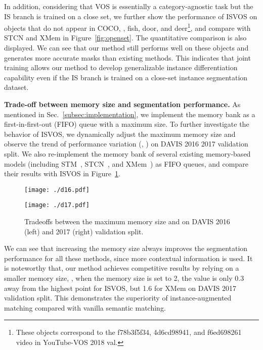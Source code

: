 \documentclass[10pt,twocolumn,letterpaper]{article}
\newcommand{\system}{ISVOS\xspace}
\begin{document}
In addition, considering that VOS is essentially a category-agnostic task but the IS branch is trained on a close set, we further show the performance of \system on objects that do not appear in COCO, \eg, fish, door, and deer\footnote{These objects correspond to the f78b3f5f34, 4d6cd98941, and f6ed698261 video in YouTube-VOS 2018 val.}, and compare with STCN and XMem in Figure~\ref{fig:openset}. The quantitative comparison is also displayed. We can see that our method still performs well on these objects and generates more accurate masks than existing methods. This indicates that joint training allows our method to develop generalizable instance differentiation capability even if the IS branch is trained on a close-set instance segmentation dataset.

\vspace{0.05in}
\noindent \textbf{Trade-off between memory size and segmentation performance.} As mentioned in Sec.~\ref{subsec:implementation}, we implement the memory bank as a first-in-first-out (FIFO) queue with a maximum size. To further investigate the behavior of \system, we dynamically adjust the maximum memory size and observe the trend of performance variation (\ie, ) on DAVIS 2016  2017 validation split. We also re-implement the memory bank of several existing memory-based models (including STM~\cite{oh2019video}, STCN~\cite{cheng2021stcn}, and XMem~\cite{cheng2022xmem}) as FIFO queues, and compare their results with \system in Figure~\ref{fig:tradeoffs}.

\begin{figure}[!ht]
\begin{minipage}[t]{0.49\linewidth}
\centering
\texttt{[image: ./d16.pdf]}
\end{minipage}
\begin{minipage}[t]{0.49\linewidth}
\centering
\texttt{[image: ./d17.pdf]}
\end{minipage}
\vspace{-0.1in}
\caption{Tradeoffs between the maximum memory size and  on DAVIS 2016 (left) and 2017 (right) validation split.}
\label{fig:tradeoffs}
\end{figure}

We can see that increasing the memory size always improves the segmentation performance for all these methods,  since more contextual information is used. It is noteworthy that, our method achieves competitive results by relying on a smaller memory size, \eg, when the memory size is set to 2, the  value is only 0.3 away from the highest point for \system, but 1.6 for XMem on DAVIS 2017 validation split. This demonstrates the superiority of instance-augmented matching compared with vanilla semantic matching.
\end{document}
